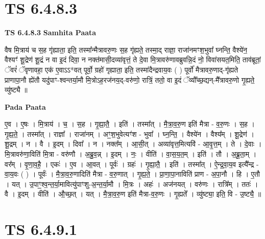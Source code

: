 \documentclass[17pt]{extarticle}
\begin{document}

\section{ TS 6.4.8.3 }

\textbf{TS 6.4.8.3 } \newline
\textbf{Samhita Paata} \newline

वैष मि॒त्राय॑ च स॒ह गृ॑ह्याता॒ इति॒ तस्मा᳚न्मैत्रावरु॒णः स॒ह गृ॑ह्यते॒ तस्मा॒द् राज्ञा॒ राजा॑नमꣳश॒भुवा᳚ घ्नन्ति॒ वैश्ये॑न॒ वैश्यꣳ॑ शू॒द्रेण॑ शू॒द्रं न वा इ॒दं दिवा॒ न नक्त॑मासी॒दव्या॑वृत्तं॒ ते दे॒वा मि॒त्रावरु॑णावब्रुवन्नि॒दं नो॒ विवा॑सयत॒मिति॒ ताव॑ब्रूतां॒ ॅवरं॑ ॅवृणावहा॒ एक॑ ए॒वाऽऽ*वत् पूर्वो॒ ग्रहो॑ गृह्याता॒ इति॒ तस्मा॑दैन्द्रवाय॒वः ( ) पूर्वो॑ मैत्रावरु॒णाद्-गृ॑ह्यते प्राणापा॒नौ ह्ये॑तौ यदु॑पाꣳ-श्वन्तर्या॒मौ मि॒त्रोऽह॒रज॑नय॒द्-वरु॑णो॒ रात्रिं॒ ततो॒ वा इ॒दं ॅव्यौ᳚च्छ॒द्यन्-मै᳚त्रावरु॒णो गृ॒ह्यते॒ व्यु॑ष्ट्यै ॥ \newline

\textbf{Pada Paata} \newline

ए॒व । ए॒षः । मि॒त्राय॑ । च॒ । स॒ह । गृ॒ह्या॒तै॒ । इति॑ । तस्मा᳚त् । मै॒त्रा॒व॒रु॒ण इति॑ मैत्रा - व॒रु॒णः । स॒ह । गृ॒ह्य॒ते॒ । तस्मा᳚त् । राज्ञा᳚ । राजा॑नम् । अꣳ॒॒श॒भुवेत्यꣳ॑श - भुवा᳚ । घ्न॒न्ति॒ । वैश्ये॑न । वैश्य᳚म् । शू॒द्रेण॑ । शू॒द्रम् । न । वै । इ॒दम् । दिवा᳚ । न । नक्त᳚म् । आ॒सी॒त् । अव्या॑वृत्त॒मित्यवि॑ - आ॒वृ॒त्त॒म् । ते । दे॒वाः । मि॒त्रावरु॑णा॒विति॑ मि॒त्रा - वरु॑णौ । अ॒ब्रु॒व॒न्न् । इ॒दम् । नः॒ । वीति॑ । वा॒स॒य॒त॒म् । इति॑ । तौ । अ॒ब्रू॒ता॒म् । वर᳚म् । वृ॒णा॒व॒है॒ । एकः॑ । ए॒व । आ॒वत् । पूर्वः॑ । ग्रहः॑ । गृ॒ह्या॒तै॒ । इति॑ । तस्मा᳚त् । ऐ॒न्द्र॒वा॒य॒व इत्यै᳚न्द्र - वा॒य॒वः ( ) । पूर्वः॑ । मै॒त्रा॒व॒रु॒णादिति॑ मैत्रा - व॒रु॒णात् । गृ॒ह्य॒ते॒ । प्रा॒णा॒पा॒नाविति॑ प्राण - अ॒पा॒नौ । हि । ए॒तौ । यत् । उ॒पाꣳ॒॒श्व॒न्त॒र्या॒मावित्यु॑पाꣳशु-अ॒न्त॒र्या॒मौ । मि॒त्रः । अहः॑ । अज॑नयत् । वरु॑णः । रात्रि᳚म् । ततः॑ । वै । इ॒दम् । वीति॑ । औ॒च्छ॒त् । यत् । मै॒त्रा॒व॒रु॒ण इति॑ मैत्रा-व॒रु॒णः । गृ॒ह्यते᳚ । व्यु॑ष्ट्या॒ इति॒ वि - उ॒ष्ट्यै॒ ॥  \newline





\section{ TS 6.4.9.1 }
\end{document}
